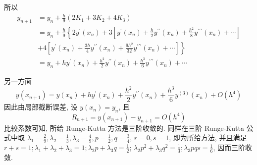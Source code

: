 \begin{tcolorbox}[enhanced,colback=8,colframe=7,breakable,coltitle=green!25!black,title=2024]
所以
$$
\begin{aligned}
y_{n+1} & =y_{n}+\frac{h}{9}\left(2 K_{1}+3 K_{2}+4 K_{3}\right) \\
& =y_{n}+\frac{h}{9}\left\{2 y^{\prime}\left(x_{n}\right)+3\left[y^{\prime}\left(x_{n}\right)+\frac{h}{2} y^{\prime \prime}\left(x_{n}\right)+\frac{h^{2}}{8} y^{\prime \prime \prime}\left(x_{n}\right)+\cdots\right]\right.\\
& \left.+4\left[y^{\prime}\left(x_{n}\right)+\frac{3 h}{4} y^{\prime \prime}\left(x_{n}\right)+\frac{9 h^{2}}{32} y^{\prime \prime \prime}\left(x_{n}\right)+\cdots\right]\right\} \\
&=  y_{n}+h y^{\prime}\left(x_{n}\right)+\frac{h^{2}}{2} y^{\prime \prime}\left(x_{n}\right)+\frac{h^{3}}{6} y^{\prime \prime \prime}\left(x_{n}\right)+\cdots
\end{aligned}
$$


另一方面
$$
y\left(x_{n+1}\right)=y\left(x_{n}\right)+h y^{\prime}\left(x_{n}\right)+\frac{h^{2}}{2} y^{\prime \prime}\left(x_{n}\right)+\frac{h^{3}}{6} y^{(3)}\left(x_{n}\right)+O\left(h^{4}\right)
$$
因此由局部截断误差, 设 $ y\left(x_{n}\right)=y_{n} $, 且
$$
R_{n+1}=y\left(x_{n+1}\right)-y_{n+1}=O\left(h^{4}\right)
$$
比较系数可知, 所给 Runge-Kutta 方法是三阶收敛的.
同样在三阶 Runge-Kutta 公式中取 $ \lambda_{1}=\frac{2}{9}, \lambda_{2}=\frac{1}{3}, \lambda_{3}=\frac{4}{9}, p=\frac{1}{2}, q=\frac{3}{4} $, $ r=0, s=1 $, 即为所给方法, 并且满足 $ r+s=1 ; \lambda_{1}+\lambda_{2}+\lambda_{3}=1 ; \lambda_{2} p+\lambda_{3} q=\frac{1}{2} $; $ \lambda_{2} p^{2}+\lambda_{3} q^{2}=\frac{1}{3} ; \lambda_{3} p q s=\frac{1}{6} $, 因而三阶收敛.


 \end{tcolorbox}


  \begin{tcolorbox}[enhanced,colback=8,colframe=7,breakable,coltitle=green!25!black,title=2024]
 
 \end{tcolorbox}


